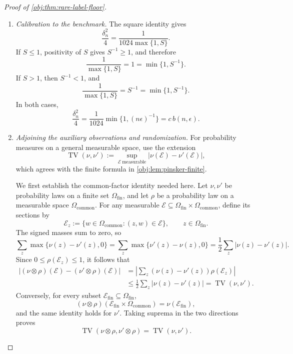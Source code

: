 \documentclass[11pt]{article}
\begin{document}
\begin{proof}[Proof of \cref{obj:thm:rare-label-floor}]
\begin{enumerate}
\item \textit{Calibration to the benchmark.}
The square identity gives
\[
\frac{\delta_n^2}{4}
=
\frac1{1024\max\{1,S\}}.
\]
If \(S\le1\), positivity of \(S\) gives \(S^{-1}\ge1\), and therefore
\[
\frac1{\max\{1,S\}}=1=\min\{1,S^{-1}\}.
\]
If \(S>1\), then \(S^{-1}<1\), and
\[
\frac1{\max\{1,S\}}=S^{-1}=\min\{1,S^{-1}\}.
\]
In both cases,
\[
\frac{\delta_n^2}{4}
=
\frac1{1024}\min\{1,(n\epsilon)^{-1}\}
=
c\,b(n,\epsilon).
\]

\item \textit{Adjoining the auxiliary observations and randomization.}
For probability measures on a general measurable space, use the extension
\[
\operatorname{TV}(\nu,\nu')
:=
\sup_{\mathcal E\ \mathrm{measurable}}
|\nu(\mathcal E)-\nu'(\mathcal E)|,
\]
which agrees with the finite formula in \cref{obj:lem:pinsker-finite}.

We first establish the common-factor identity needed here. Let
\(\nu,\nu'\) be probability laws on a finite set
\(\Omega_{\mathrm{fin}}\), and let \(\rho\) be a probability law on a
measurable space \(\Omega_{\mathrm{common}}\). For any measurable
\(\mathcal E\subseteq
\Omega_{\mathrm{fin}}\times\Omega_{\mathrm{common}}\), define its sections by
\[
\mathcal E_z:=\{w\in\Omega_{\mathrm{common}}:(z,w)\in\mathcal E\},
\qquad z\in\Omega_{\mathrm{fin}}.
\]
The signed masses sum to zero, so
\[
\sum_z\max\{\nu(z)-\nu'(z),0\}
=
\sum_z\max\{\nu'(z)-\nu(z),0\}
=
\frac12\sum_z|\nu(z)-\nu'(z)|.
\]
Since \(0\le\rho(\mathcal E_z)\le1\), it follows that
\[
\begin{aligned}
|(\nu\otimes\rho)(\mathcal E)-(\nu'\otimes\rho)(\mathcal E)|
&=
\left|
\sum_z(\nu(z)-\nu'(z))\rho(\mathcal E_z)
\right|\\
&\le\frac12\sum_z|\nu(z)-\nu'(z)|
=\operatorname{TV}(\nu,\nu').
\end{aligned}
\]
Conversely, for every subset
\(\mathcal E_{\mathrm{fin}}\subseteq\Omega_{\mathrm{fin}}\),
\[
(\nu\otimes\rho)
(\mathcal E_{\mathrm{fin}}\times\Omega_{\mathrm{common}})
=
\nu(\mathcal E_{\mathrm{fin}}),
\]
and the same identity holds for \(\nu'\). Taking suprema in the two
directions proves
\[
\operatorname{TV}(\nu\otimes\rho,\nu'\otimes\rho)
=
\operatorname{TV}(\nu,\nu').
\]


\end{enumerate}
\end{proof}
\end{document}
